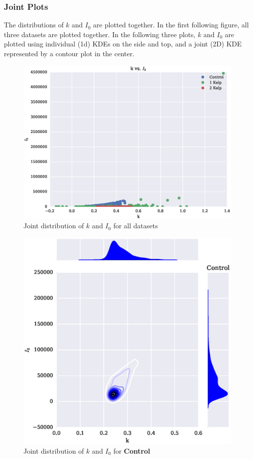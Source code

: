 \documentclass{article}
\begin{document}
\subsubsection{Joint Plots}

The distributions of $k$ and $I_0$ are plotted together. In the first following figure, all three datasets are plotted together. In the following three plots, $k$ and $I_0$ are plotted using individual (1d) KDEs on the side and top, and a joint (2D) KDE represented by a contour plot in the center.

\begin{figure}[H]
	\centering
	\includegraphics[width=\textwidth]{k_I0.eps}
	\caption{Joint distribution of $k$ and $I_0$ for all datasets}
\end{figure}

\begin{figure}[H]
	\centering
	\includegraphics[width=\textwidth]{joint_control.eps}
	\caption{Joint distribution of $k$ and $I_0$ for \textbf{Control}}
	\label{joint_control}
\end{figure}
\end{document}
